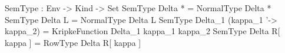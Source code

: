 \begin{agdaf}
SemType : Env -> Kind -> Set
SemType Delta * = NormalType Delta *
SemType Delta L = NormalType Delta L 
SemType Delta_1 (kappa_1 '-> kappa_2) = KripkeFunction Delta_1  kappa_1  kappa_2 
SemType Delta R[ kappa ] = RowType Delta R[ kappa ]
\end{agdaf}

